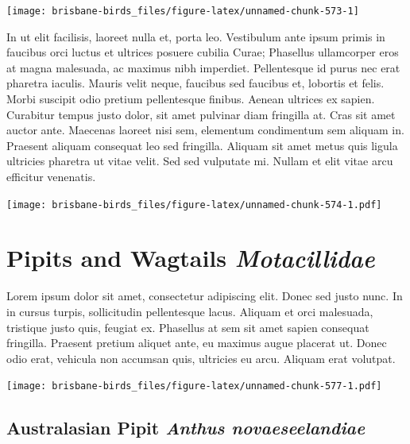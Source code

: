 \documentclass[]{book}
\let\origfigure\figure
\let\endorigfigure\endfigure
\renewenvironment{figure}[1][2] {
  \expandafter\origfigure\expandafter[H]
} {
  \endorigfigure
}
\begin{document}
\begin{figure}
\texttt{[image: brisbane-birds\_files/figure-latex/unnamed-chunk-573-1]} \caption{insert figure caption}\label{fig:unnamed-chunk-573}
\end{figure}

In ut elit facilisis, laoreet nulla et, porta leo. Vestibulum ante ipsum
primis in faucibus orci luctus et ultrices posuere cubilia Curae;
Phasellus ullamcorper eros at magna malesuada, ac maximus nibh
imperdiet. Pellentesque id purus nec erat pharetra iaculis. Mauris velit
neque, faucibus sed faucibus et, lobortis et felis. Morbi suscipit odio
pretium pellentesque finibus. Aenean ultrices ex sapien. Curabitur
tempus justo dolor, sit amet pulvinar diam fringilla at. Cras sit amet
auctor ante. Maecenas laoreet nisi sem, elementum condimentum sem
aliquam in. Praesent aliquam consequat leo sed fringilla. Aliquam sit
amet metus quis ligula ultricies pharetra ut vitae velit. Sed sed
vulputate mi. Nullam et elit vitae arcu efficitur venenatis.

\begin{figure}
\centering
\texttt{[image: brisbane-birds\_files/figure-latex/unnamed-chunk-574-1.pdf]}
\caption{\label{fig:unnamed-chunk-574}insert figure caption}
\end{figure}

\chapter{\texorpdfstring{Pipits and Wagtails
\emph{Motacillidae}}{Pipits and Wagtails Motacillidae}}\label{pipits-and-wagtails-motacillidae}

Lorem ipsum dolor sit amet, consectetur adipiscing elit. Donec sed justo
nunc. In in cursus turpis, sollicitudin pellentesque lacus. Aliquam et
orci malesuada, tristique justo quis, feugiat ex. Phasellus at sem sit
amet sapien consequat fringilla. Praesent pretium aliquet ante, eu
maximus augue placerat ut. Donec odio erat, vehicula non accumsan quis,
ultricies eu arcu. Aliquam erat volutpat.

\texttt{[image: brisbane-birds\_files/figure-latex/unnamed-chunk-577-1.pdf]}

\section{\texorpdfstring{Australasian Pipit \emph{Anthus
novaeseelandiae}}{Australasian Pipit Anthus novaeseelandiae}}\label{australasian-pipit-anthus-novaeseelandiae}
\end{document}
